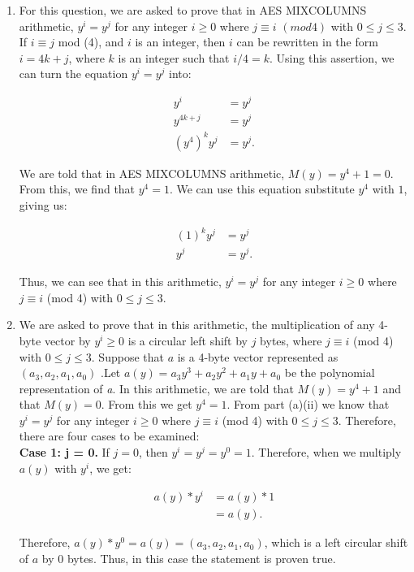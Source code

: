 \documentclass[11pt]{article}
\theoremstyle{definition}
\begin{document}
\begin{enumerate}
\begin{enumerate}
\begin{enumerate}
\item For this question, we are asked to prove that in AES MIXCOLUMNS arithmetic, $y^i = y^j$ for any integer $i \geq 0$ where $j \equiv i$  $(mod 4)$ with $0 \leq j \leq 3$. If $i \equiv j$ mod (4), and $i$ is an integer, then $i$ can be rewritten in the form $i = 4k + j$, where $k$ is an integer such that $i/4 = k$. Using this assertion, we can turn the equation $y^i = y^j$ into:

\begin{align*}
    y^i &= y^j \\
    y^{4k + j} &= y^j \\
    (y^4)^k y^j &= y^j.
\end{align*}

We are told that in AES MIXCOLUMNS arithmetic, $M(y) = y^4 + 1 = 0$. From this, we find that $y^4 = 1$. We can use this equation substitute $y^4$ with $1$, giving us:

\begin{align*}
    (1)^k y^j &= y^j \\
    y^j &= y^j.
\end{align*}

Thus, we can see that in this arithmetic, $y^i = y^j$ for any integer $i \geq 0$ where $j \equiv i$ (mod 4) with $0 \leq j \leq 3$.
\\

\item We are asked to prove that in this arithmetic, the multiplication of any 4-byte vector by $y^i \geq 0$ is a circular left shift by $j$ bytes, where $j \equiv i$ (mod 4) with $0 \leq j \leq 3$. Suppose that $a$ is a 4-byte vector represented as $(a_3, a_2, a_1, a_0)$ .Let $a(y) = a_3y^3 + a_2y^2 + a_1y + a_0$ be the polynomial representation of \textit{a}. In this arithmetic, we are told that $M(y) = y^4 + 1$ and that $M(y) = 0$. From this we get $y^4 = 1$. From part (a)(ii) we know that $y^i = y^j$ for any integer $i \geq 0$ where $j \equiv i$ (mod 4) with $0 \leq j \leq 3$. Therefore, there are four cases to be examined: \\

\textbf{Case 1: j = 0.}
If $j = 0$, then $y^i = y^j = y^0 = 1$. Therefore, when we multiply $a(y)$ with $y^i$, we get:

\begin{align*}
    a(y) * y^i &= a(y) * 1 \\
    &= a(y).
\end{align*}

Therefore, $a(y) * y^0 = a(y) = (a_3, a_2, a_1, a_0)$, which is a left  circular shift of $a$ by 0 bytes. Thus, in this case the statement is proven true.
\\


\end{enumerate}
\end{enumerate}
\end{enumerate}
\end{document}
